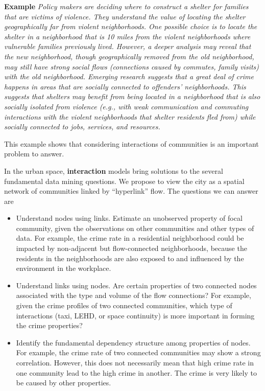 \textbf{Example} \emph{Policy makers are deciding where to construct a shelter for families that are victims of violence. They understand the value of locating the shelter geographically far from violent neighborhoods. One possible choice is to locate the shelter in a neighborhood that is 10 miles from the violent neighborhoods where vulnerable families previously lived. However, a deeper analysis may reveal that the new neighborhood, though geographically removed from the old neighborhood, may still have strong social flows (connections caused by commutes, family visits) with the old neighborhood. Emerging research suggests that a great deal of crime happens in areas that are socially connected to offenders' neighborhoods. This suggests that shelters may benefit from being located in a neighborhood that is also socially isolated from violence (e.g., with weak communication and commuting interactions with the violent neighborhoods that shelter residents fled from) while socially connected to jobs, services, and resources.}


This example shows that considering interactions of communities is an important problem to answer.


In the urban space, \textbf{interaction} models bring solutions to the several fundamental data mining questions. We propose to view the city as a spatial network of communities linked by ``hyperlink'' flow. The questions we can answer are
\begin{itemize}
\item Understand nodes using links. Estimate an unobserved property of focal community, given the observations on other communities and other types of data. For example, the crime rate in a residential neighborhood could be impacted by  non-adjacent but flow-connected neighborhoods, because the residents in the neighborhoods are also exposed to and influenced by the environment in the workplace.
\item Understand links using nodes. Are certain properties of two connected nodes associated with the type and volume of the flow connections? For example, given the crime profiles of two connected communities, which type of interactions (taxi, LEHD, or space continuity) is more important in forming the crime properties?
\item Identify the fundamental dependency structure among properties of nodes. For example, the crime rate of two connected communities may show a strong correlation. However, this does not necessarily mean that high crime rate in one community lead to the high crime in another. The crime is very likely to be caused by other properties. 
\end{itemize}




